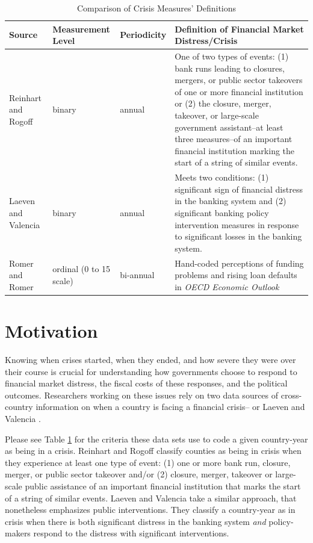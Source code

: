 \documentclass[]{article}
\begin{document}
\begin{table}
    \caption{Comparison of Crisis Measures' Definitions}
    \label{comp_table}
    \begin{center}
        \begin{tabular}{m{3cm} | m{2cm} m{2cm} m{7cm}}
            Source & Measurement Level & Periodicity &  Definition of Financial Market Distress/Crisis \\
            \hline\hline
                Reinhart and Rogoff \citeyearpar[11]{Reinhart2009,ReinhartRog2010} & binary & annual & One of two types of events: (1) bank runs leading to closures, mergers, or public sector takeovers of one or more financial institution or (2) the closure, merger, takeover, or large-scale government assistant--at least three measures--of an important financial institution marking the start of a string of similar events.  \\
                Laeven and Valencia \citeyearpar[228]{laeven2013} & binary & annual & Meets two conditions: (1) significant sign of financial distress in the banking system and (2) significant banking policy intervention measures in response to significant losses in the banking system.  \\
                Romer and Romer \citeyearpar[3]{Romer2015} & ordinal (0 to 15 scale) & bi-annual & Hand-coded perceptions of funding problems and rising loan defaults in \emph{OECD Economic Outlook}  \\
            \hline
        \end{tabular}
    \end{center}
\end{table}

\section{Motivation}\label{motivation}

Knowing when crises started, when they ended, and how severe they were over their course is crucial for understanding how governments choose to respond to financial market distress, the fiscal costs of these responses, and the political outcomes. Researchers working on these issues rely on two data sources of cross-country information on when a country is facing a financial crisis--\cite{Reinhart2009,ReinhartRog2010} or Laeven and Valencia \citeyearpar[and their predecessors]{laeven2013}.

Please see Table \ref{comp_table} for the criteria these data sets use to code a given country-year as being in a crisis. Reinhart and Rogoff \citeyearpar[10]{Reinhart2009,ReinhartRog2010} classify counties as being in crisis when they experience at least one type of event: (1) one or more bank run, closure, merger, or public sector takeover and/or (2) closure, merger, takeover or large-scale public assistance of an important financial institution that marks the start of a string of similar events. Laeven and Valencia \citeyearpar[228]{laeven2013} take a similar approach, that nonetheless emphasizes public interventions. They classify a country-year as in crisis when there is both significant distress in the banking system \emph{and} policy-makers respond to the distress with significant interventions.
\end{document}
